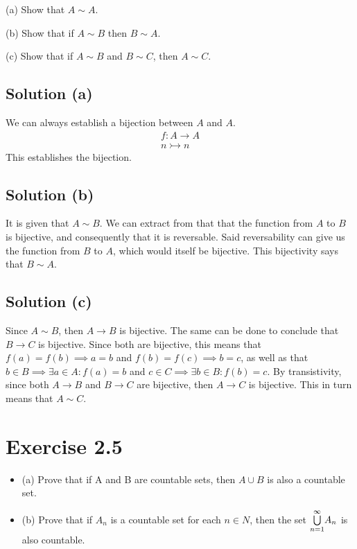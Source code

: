 \documentclass[12pt]{report}
\begin{document}
(a) Show that $A \sim A$.  

(b) Show that if $A \sim B$ then $B \sim A$.  

(c) Show that if $A \sim B$ and $B \sim C$, then $A \sim C$. 

\subsection{Solution (a)}
We can always establish a bijection between $A$ and $A$.
\begin{gather}
    f: A \to A \\
    n \rightarrowtail n
\end{gather}
This establishes the bijection. 

\subsection{Solution (b)}
It is given that $A \sim B$. 
We can extract from that that the function from $A$ to $B$ is bijective, and consequently that it is reversable.
Said reversability can give us the function from $B$ to $A$, which would itself be bijective. 
This bijectivity says that $B \sim A$. 

\subsection{Solution (c)}
Since $A \sim B$, then $A \to B$ is bijective.
The same can be done to conclude that $B \to C$ is bijective.
Since both are bijective, this means that $f(a) = f(b) \implies a = b$ and $f(b) = f(c) \implies b = c$, as well as that $b \in B \implies \exists a \in A : f(a) = b$ and $c \in C \implies \exists b \in B : f(b) = c$.
By transistivity, since both $A \to B$ and $B \to C$ are bijective, then $A \to C$ is bijective.
This in turn means that $A \sim C$.

\pagebreak
\section{Exercise 2.5}
\begin{itemize}
    \item (a) Prove that if A and B are countable sets, then $A \cup B$ is also a countable set.  
    
    \item (b) Prove that if $A_n$ is a countable set for each $n \in N$, then the set  $\overunderset{\infty}{n = 1}{\bigcup} A_n$ is also countable. 
\end{itemize}
\end{document}
